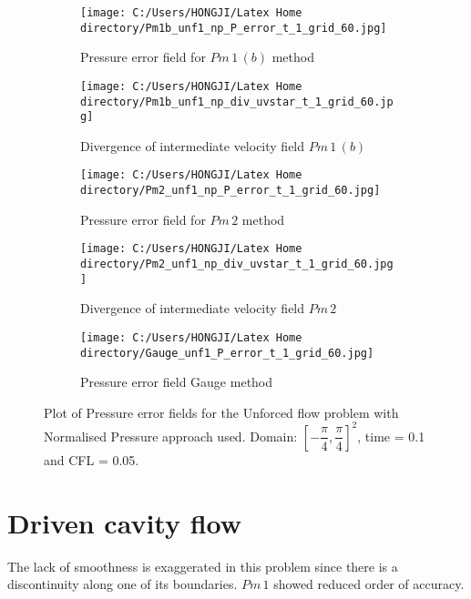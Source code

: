 \begin{figure}[H]
	\centering
	\begin{subfigure}[t]{2.5in}
		\centering
		\texttt{[image: C:/Users/HONGJI/Latex Home directory/Pm1b\_unf1\_np\_P\_error\_t\_1\_grid\_60.jpg]}
		\caption{Pressure error field for $Pm\,1\,(b)$ method}\label{fig:6.19a}		
	\end{subfigure}
	\quad
	\begin{subfigure}[t]{2.5in}
		\centering
		\texttt{[image: C:/Users/HONGJI/Latex Home directory/Pm1b\_unf1\_np\_div\_uvstar\_t\_1\_grid\_60.jpg]}
		\caption{Divergence of intermediate velocity field $Pm\,1\,(b)$}\label{fig:6.19b}
	\end{subfigure}
	\quad
	\centering
	\begin{subfigure}[t]{2.5in}
		\centering
		\texttt{[image: C:/Users/HONGJI/Latex Home directory/Pm2\_unf1\_np\_P\_error\_t\_1\_grid\_60.jpg]}
		\caption{Pressure error field for $Pm\,2$ method}\label{fig:6.19a}		
	\end{subfigure}
	\quad
	\begin{subfigure}[t]{2.5in}
		\centering
		\texttt{[image: C:/Users/HONGJI/Latex Home directory/Pm2\_unf1\_np\_div\_uvstar\_t\_1\_grid\_60.jpg]}
		\caption{Divergence of intermediate velocity field $Pm\,2$}\label{fig:6.19b}
	\end{subfigure}
	\quad
	\begin{subfigure}[t]{2.5in}
		\centering
		\texttt{[image: C:/Users/HONGJI/Latex Home directory/Gauge\_unf1\_P\_error\_t\_1\_grid\_60.jpg]}
		\caption{Pressure error field Gauge method }\label{fig:6.19b}
	\end{subfigure}
	\caption{Plot of Pressure error fields for the Unforced flow problem with Normalised Pressure approach used. Domain: $[-\dfrac{\pi}{4}, \dfrac{\pi}{4}]^2$, time = 0.1 and CFL = 0.05.}\label{fig:6.16}
\end{figure}

\section{Driven cavity flow}
The lack of smoothness is exaggerated in this problem since there is a discontinuity along one of its boundaries. $Pm\,1$ showed reduced order of accuracy.

